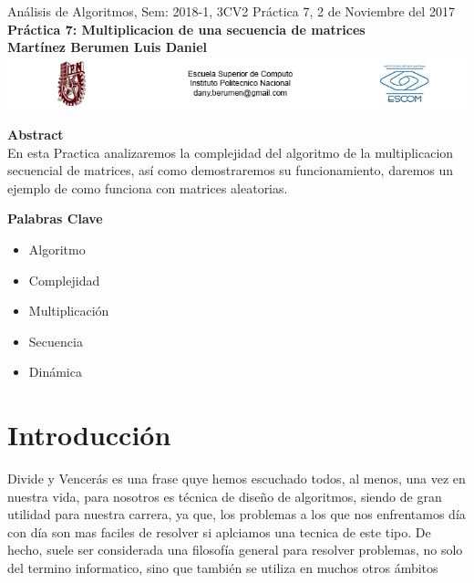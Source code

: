 \documentclass[spanish]{article}
\begin{document}
	\setmarginsrb{30mm}{30mm}{30mm}{30mm}{0pt}{0mm}{0pt}{0mm}
	
	\begin{center}
	{ Análisis de Algoritmos, Sem: 2018-1, 3CV2 Práctica 7, 2 de Noviembre del 2017}\\
{ {\bf Práctica 7: Multiplicacion de una secuencia de matrices}} \\
{ {\bf Martínez Berumen Luis Daniel}} \\
\includegraphics[width=1\textwidth, right]{./imagenes/logos.png}
	\end{center}

	\bigskip
	
	\bigskip
	
	\bigskip
	
	{\LARGE {\bf Abstract}}\\
En esta Practica analizaremos la complejidad del algoritmo de la multiplicacion secuencial de matrices, así como demostraremos su funcionamiento, daremos un ejemplo de como funciona con matrices aleatorias.

\bigskip

	{\Large {\bf Palabras Clave}}\\
	\begin{itemize}
		\item Algoritmo
		\item Complejidad
		\item Multiplicación
		\item Secuencia
		\item Dinámica
	\end{itemize}
	
	\section{Introducci\'on}
Divide y Vencerás es una frase quye hemos escuchado todos, al menos, una vez en nuestra vida, para nosotros 
	es técnica de diseño de algoritmos, siendo de gran utilidad para nuestra carrera, ya que, 
	los problemas a los que nos enfrentamos día con día son mas faciles de resolver si aplciamos una tecnica de este tipo.
	De hecho, suele ser considerada una filosofía general para resolver problemas, no solo del termino informatico, sino que también           se utiliza en muchos otros ámbitos
\end{document}
